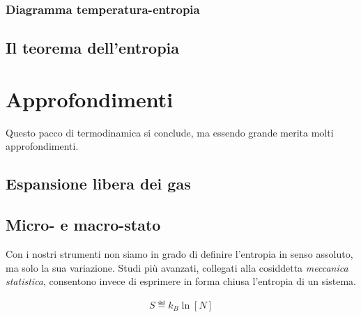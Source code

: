 \subsubsection*{Diagramma temperatura-entropia}







\subsection{Il teorema dell'entropia}









\section{Approfondimenti}
Questo pacco di termodinamica si conclude, ma essendo grande
merita molti approfondimenti.


\subsection{Espansione libera dei gas}

\subsection{Micro- e macro-stato}
Con i nostri strumenti non siamo in grado di definire l'entropia in
senso assoluto, ma solo la sua variazione. Studi più avanzati,
collegati alla cosiddetta \textit{meccanica statistica}, consentono
invece di esprimere in forma chiusa l'entropia di un sistema.

\begin{align}
    S \eqdef k_B \ln [N]\label{entropia_meccanica_statistica}
\end{align}

